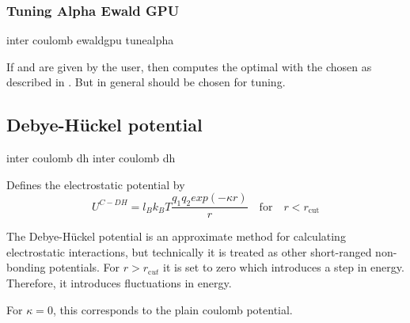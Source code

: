 \subsubsection{Tuning Alpha Ewald GPU}
\label{ssec:tunealphaewaldgpu}
\begin{essyntax}
  inter coulomb  ewaldgpu tunealpha
    
  \begin{features}
  \end{features}
\end{essyntax}

If  and  are given by the user, then  computes the optimal  with the chosen  as described in \cite{kolafa92}. But in general  should be chosen for tuning. 


\subsection{Debye-H\"uckel potential}

\begin{essyntax}
  inter coulomb  dh \var{\kappa} 
  inter coulomb  dh \var{\kappa} 
     \var{\alpha}    
  \begin{features}
  \end{features}
\end{essyntax}

Defines the electrostatic potential by
\begin{equation}
  U^{C-DH} = l_B k_B T \frac{q_1 q_2 exp(-\kappa r)}{r}\quad \mathrm{for}\quad r<r_{\mathrm{cut}}
\end{equation}

The Debye-H\"uckel potential is an approximate method for calculating
electrostatic interactions, but technically it is treated as other
short-ranged non-bonding potentials. For $r>r_{\mathrm cut}$ it is set 
to zero which introduces a step in energy. Therefore, it introduces
fluctuations in energy.

For $\kappa = 0$, this corresponds to the plain coulomb potential.

